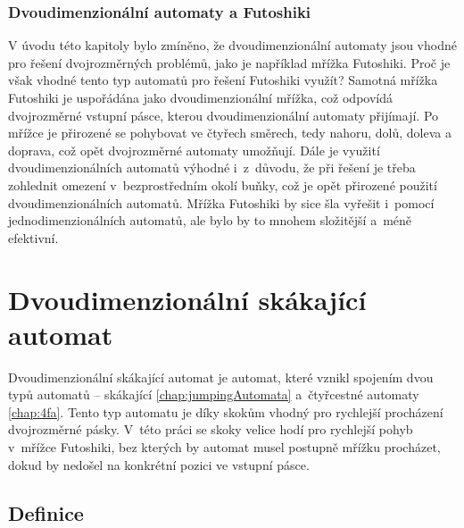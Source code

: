 \subsection{Dvoudimenzionální automaty a Futoshiki}

V úvodu této kapitoly bylo zmíněno, že dvoudimenzionální automaty jsou vhodné
pro řešení dvojrozměrných problémů, jako je například mřížka Futoshiki. Proč je
však vhodné tento typ automatů pro řešení Futoshiki využít? Samotná mřížka
Futoshiki je uspořádána jako dvoudimenzionální mřížka, což odpovídá
dvojrozměrné vstupní pásce, kterou dvoudimenzionální automaty přijímají.
Po mřížce je přirozené se pohybovat ve čtyřech směrech, tedy nahoru, dolů,
doleva a doprava, což opět dvojrozměrné automaty umožňují. Dále je využití
dvoudimenzionálních automatů výhodné i~z~důvodu, že při řešení je třeba
zohlednit omezení v~bezprostředním okolí buňky, což je opět přirozené
použití dvoudimenzionálních automatů. Mřížka Futoshiki by sice šla vyřešit
i~pomocí jednodimenzionálních automatů, ale bylo by to mnohem složitější a~méně
efektivní.

\chapter{Dvoudimenzionální skákající automat}

Dvoudimenzionální skákající automat je automat, které vznikl spojením
dvou typů automatů – skákající \ref{chap:jumpingAutomata} a~čtyřcestné
automaty \ref{chap:4fa}. Tento typ automatu je díky skokům vhodný pro rychlejší
procházení dvojrozměrné pásky. V~této práci se skoky velice hodí pro rychlejší
pohyb v~mřížce Futoshiki, bez kterých by automat musel postupně mřížku
procházet, dokud by nedošel na konkrétní pozici ve vstupní pásce.

\section{Definice}

